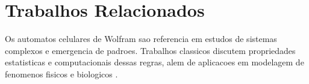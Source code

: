 \chapter{Trabalhos Relacionados}
\label{chap_trabalhos_relacionados}

Os automatos celulares de Wolfram sao referencia em estudos de sistemas complexos e emergencia de padroes. Trabalhos classicos discutem propriedades estatisticas e computacionais dessas regras, alem de aplicacoes em modelagem de fenomenos fisicos e biologicos \cite{wolfram1983,wolfram2002,chopard1998}.
